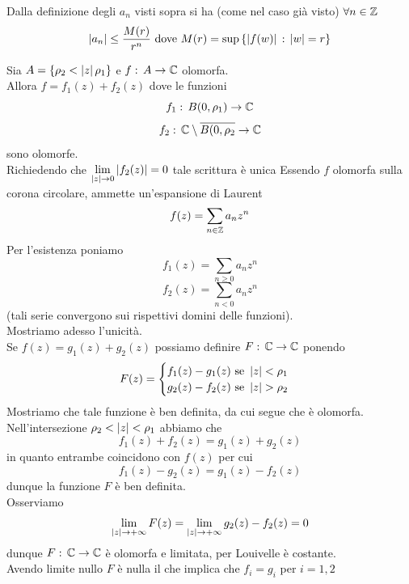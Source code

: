 \begin{oss}Dalla definizione degli $a_n$ visti sopra si ha (come nel caso gi\`a visto)  $\forall n \in \mathbb{Z}$
$$ \left\vert a_n \right\vert \leq \frac{M(r)}{r^n} \text{ dove }  M(r) = \sup\left\{ \left\vert f(w) \right\vert\, : \, \left\vert w \right\vert = r \right\}$$
\end{oss}
\begin{cor}Sia $A=\left\{ \rho_2<\left\vert z \right\vert \rho_1 \right\}$ e $f:\, A \to \mathbb{C}$ olomorfa.\\
Allora $f=f_1(z) +f_2(z)$ dove le funzioni 
$$ f_1:\, B(0,\rho_1)\to \mathbb{C}$$
$$ f_2:\, \mathbb{C} \setminus \overline{B(0, \rho_2} \to \mathbb{C}$$ 
sono olomorfe.\\
Richiedendo che $\displaystyle \lim_{\left\vert z \right\vert \to 0 } \left\vert f_2(z) \right\vert = 0 $ tale scrittura \`e unica
\proof Essendo $f$ olomorfa sulla corona circolare, ammette un'espansione di Laurent
$$ f(z) =\sum_{n \in \mathbb{Z}} a_n z^n$$
Per l'esistenza poniamo 
$$ f_1(z) = \sum_{n \geq 0 } a_n z^n$$
$$f_2(z) = \sum_{n <0} a_n z^n$$
(tali serie convergono sui rispettivi domini delle funzioni).\\
Mostriamo adesso l'unicit\`a.\\
Se $f(z)=g_1(z) + g_2(z)$ possiamo definire $F:\, \mathbb{C} \to \mathbb{C}$ ponendo 
$$ F(z) =\begin{cases} f_1(z) - g_1(z) \text{ se } \left\vert z \right\vert < \rho_1 \\
g_2(z) - f_2(z) \text{ se } \left\vert z \right\vert > \rho_2  \end{cases}$$
Mostriamo che tale funzione \`e ben definita, da cui segue che \`e olomorfa.\\
Nell'intersezione $\rho_2< \left\vert z \right\vert < \rho_1$ abbiamo che 
$$ f_1(z) +f_2(z) = g_1(z) + g_2(z)$$ 
in quanto entrambe coincidono con $f(z)$ per cui 
$$ f_1(z) - g_2(z) = g_1(z) -f_2(z)$$
dunque la funzione $F$ \`e ben definita.\\
Osserviamo $$\lim_{\left\vert z \right\vert \to + \infty } F(z) = \lim_{\left\vert z \right\vert \to +\infty } g_2(z) - f_2(z) = 0$$ 
dunque 
$F: \, \mathbb{C} \to \mathbb{C}$ \`e olomorfa e limitata, per Louivelle \`e costante.\\
Avendo limite nullo $F$ \`e nulla il che implica che $f_i=g_i$ per $i=1,2$
\endproof
\end{cor}
\newpage
